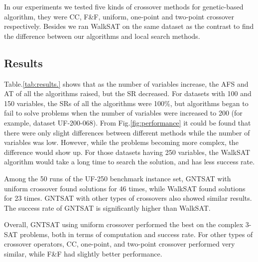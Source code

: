 In our experiments we tested five kinds of crossover methods for genetic-based
algorithm, they were CC, F\&F, uniform, one-point and two-point crossover
respectively. Besides we ran WalkSAT on the same dataset as the contrast to
find the difference between our algorithms and local search methods.

\subsection{Results}

Table.\ref{tab:results.} shows that as the number of variables increase,
the AFS and AT of all the algorithms raised, but the SR decreased. For
datasets with 100 and 150 variables, the SRs of all the algorithms were 100\%,
but algorithms began to fail to solve problems when the number of variables
were increased to 200 (for example, dataset UF-200-068). From
Fig.\ref{fig:performance} it could be found that there were only slight
differences between different methods while the number of variables was low.
However, while the problems becoming more complex, the difference would show
up. For those datasets having 250 variables, the WalkSAT algorithm would take
a long time to search the solution, and has less success rate.

Among the 50 runs of the UF-250 benchmark instance set, GNTSAT with uniform
crossover found solutions for 46 times, while WalkSAT found solutions for 23
times. GNTSAT with other types of crossovers also showed similar results. The
success rate of GNTSAT is significantly higher than WalkSAT.

Overall, GNTSAT using uniform crossover performed the best on the complex
3-SAT problems, both in terms of computation and success rate. For other types
of crossover operators, CC, one-point, and two-point crossover performed very
similar, while F\&F had slightly better performance.
